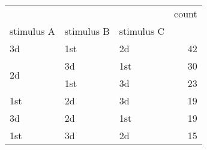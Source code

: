 \begin{tabular}{lllr}
\toprule
 &  &  & count \\
stimulus A & stimulus B & stimulus C &  \\
\midrule
3d & 1st & 2d & 42 \\
\cline{1-4} \cline{2-4}
\multirow[t]{2}{*}{2d} & 3d & 1st & 30 \\
\cline{2-4}
 & 1st & 3d & 23 \\
\cline{1-4} \cline{2-4}
1st & 2d & 3d & 19 \\
\cline{1-4} \cline{2-4}
3d & 2d & 1st & 19 \\
\cline{1-4} \cline{2-4}
1st & 3d & 2d & 15 \\
\cline{1-4} \cline{2-4}
\bottomrule
\end{tabular}
